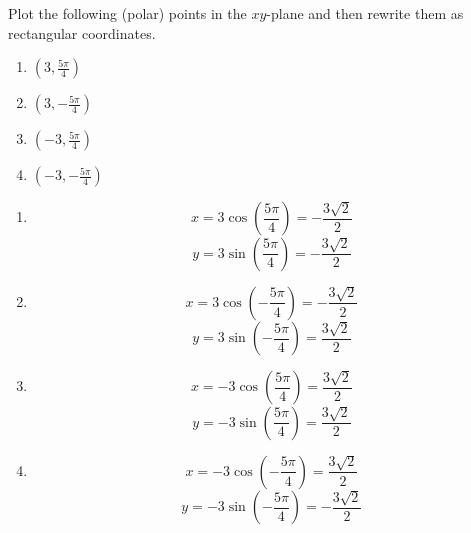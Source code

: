 \documentclass[]{ximera}
\begin{document}
\begin{problem}
Plot the following (polar) points in the $xy$-plane and then rewrite them as rectangular coordinates.
	\begin{multicols}{4}
	\begin{enumerate}
	\item  $\left( 3, \frac{5 \pi}{4}   \right) $
	\item  $\left( 3, - \frac{5 \pi}{4}   \right) $
	\item  $\left( -3, \frac{5 \pi}{4}   \right) $
	\item  $\left( -3, - \frac{5 \pi}{4}   \right) $
	\end{enumerate}
	\end{multicols}
	
	\begin{freeResponse}
	\begin{enumerate}
	\item  
		\[
		x = 3 \cos \left( \frac{5 \pi}{4} \right) = - \frac{3 \sqrt{2}}{2}
		\]
		\[
		y = 3 \sin \left( \frac{5 \pi}{4} \right) = - \frac{3 \sqrt{2}}{2}
		\]
		
	
	\item  
		\[
		x = 3 \cos \left( - \frac{5 \pi}{4} \right) = - \frac{3 \sqrt{2}}{2}
		\]
		\[
		y = 3 \sin \left( - \frac{5 \pi}{4} \right) = \frac{3 \sqrt{2}}{2}
		\]
		
	
	\item  
		\[
		x = -3 \cos \left( \frac{5 \pi}{4} \right) = \frac{3 \sqrt{2}}{2}
		\]
		\[
		y = -3 \sin \left( \frac{5 \pi}{4} \right) = \frac{3 \sqrt{2}}{2}
		\]
		
	
	\item  
		\[
		x = -3 \cos \left( - \frac{5 \pi}{4} \right) = \frac{3 \sqrt{2}}{2}
		\]
		\[
		y = -3 \sin \left( -\frac{5 \pi}{4} \right) = - \frac{3 \sqrt{2}}{2}
		\]
		
	
	\end{enumerate}
	\end{freeResponse}
	
\end{problem}
\end{document}
